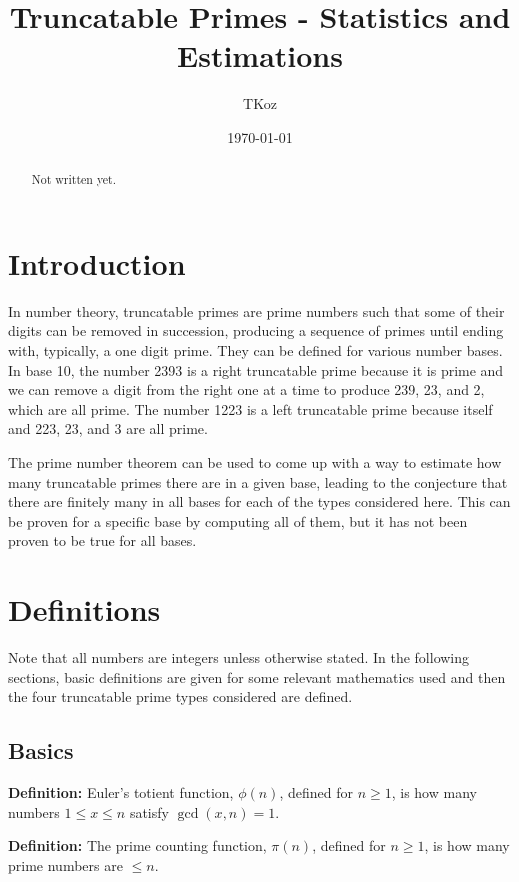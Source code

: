 \documentclass[12pt]{article}
\begin{document}
\title{Truncatable Primes - Statistics and Estimations}
\author{TKoz}
\date{\today}
\maketitle

\begin{abstract}
Not written yet.
\end{abstract}

\section{Introduction}

In number theory, truncatable primes are prime numbers such that some of their digits can be removed in succession, producing a sequence of primes until ending with, typically, a one digit prime. They can be defined for various number bases. In base 10, the number 2393 is a right truncatable prime because it is prime and we can remove a digit from the right one at a time to produce 239, 23, and 2, which are all prime. The number 1223 is a left truncatable prime because itself and 223, 23, and 3 are all prime.

The prime number theorem can be used to come up with a way to estimate how many truncatable primes there are in a given base, leading to the conjecture that there are finitely many in all bases for each of the types considered here. This can be proven for a specific base by computing all of them, but it has not been proven to be true for all bases.

\section{Definitions}

Note that all numbers are integers unless otherwise stated. In the following sections, basic definitions are given for some relevant mathematics used and then the four truncatable prime types considered are defined.

\subsection{Basics}

\textbf{Definition:} Euler's totient function, $\phi(n)$, defined for $n\geq1$, is how many numbers $1\leq x\leq n$ satisfy $\gcd(x,n)=1$.

\textbf{Definition:} The prime counting function, $\pi(n)$, defined for $n\geq1$, is how many prime numbers are $\leq n$.
\end{document}
